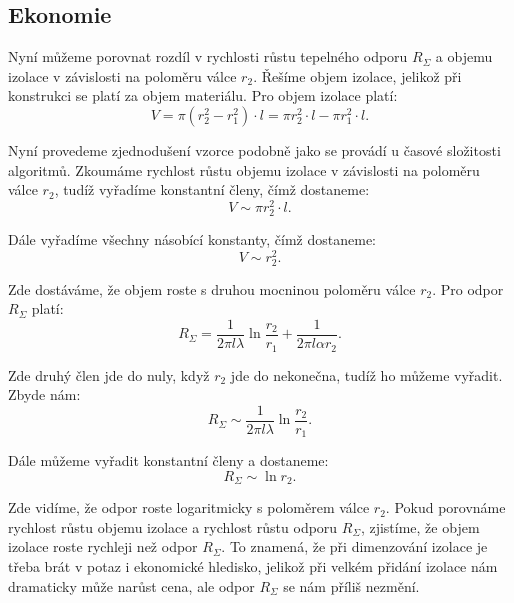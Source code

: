 \documentclass{article}
\begin{document}
\subsection{Ekonomie}

Nyní můžeme porovnat rozdíl v rychlosti růstu tepelného odporu $R_\Sigma$ a objemu izolace v závislosti na poloměru válce $r_2$. Řešíme objem izolace, jelikož při konstrukci se platí za objem materiálu. Pro objem izolace platí:
$$
    V = \pi (r_2^2 - r_1^2) \cdot l = \pi r_2^2 \cdot l - \pi r_1^2 \cdot l.
$$

Nyní provedeme zjednodušení vzorce podobně jako se provádí u časové složitosti algoritmů. Zkoumáme rychlost růstu objemu izolace v závislosti na poloměru válce $r_2$, tudíž vyřadíme konstantní členy, čímž dostaneme:
$$
    V \sim \pi r_2^2 \cdot l.
$$

Dále vyřadíme všechny násobící konstanty, čímž dostaneme:
$$
    V \sim r_2^2.
$$

Zde dostáváme, že objem roste s druhou mocninou poloměru válce $r_2$. Pro odpor $R_\Sigma$ platí:
$$
    R_\Sigma = \frac{1}{2 \pi l \lambda} \ln \frac{r_2}{r_1} + \frac{1}{2 \pi l \alpha r_2}.
$$

Zde druhý člen jde do nuly, když $r_2$ jde do nekonečna, tudíž ho můžeme vyřadit. Zbyde nám:
$$
    R_\Sigma \sim \frac{1}{2 \pi l \lambda} \ln \frac{r_2}{r_1}.
$$

Dále můžeme vyřadit konstantní členy a dostaneme:
$$
    R_\Sigma \sim \ln r_2.
$$

Zde vidíme, že odpor roste logaritmicky s poloměrem válce $r_2$. Pokud porovnáme rychlost růstu objemu izolace a rychlost růstu odporu $R_\Sigma$, zjistíme, že objem izolace roste rychleji než odpor $R_\Sigma$. To znamená, že při dimenzování izolace je třeba brát v potaz i ekonomické hledisko, jelikož při velkém přidání izolace nám dramaticky může narůst cena, ale odpor $R_\Sigma$ se nám příliš nezmění.

\begin{center}
\end{center}
\end{document}
